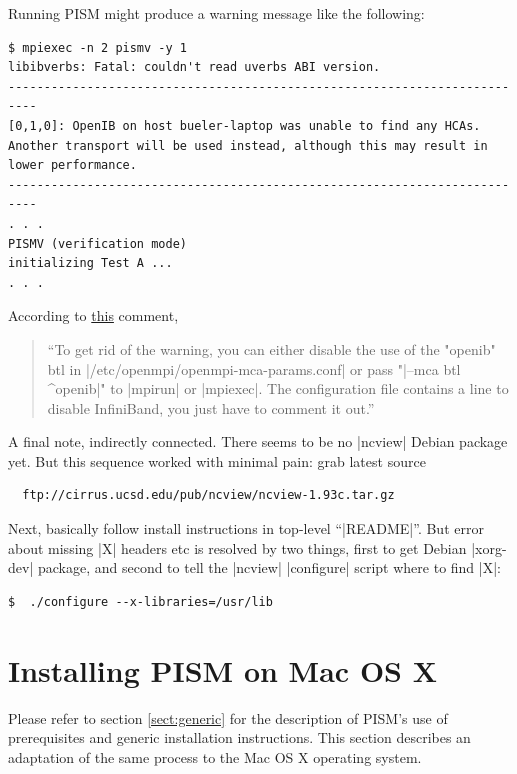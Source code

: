 \documentclass[11pt,final]{amsart}
\begin{document}
Running PISM might produce a warning message like the following:
\begin{verbatim}
$ mpiexec -n 2 pismv -y 1
libibverbs: Fatal: couldn't read uverbs ABI version.
--------------------------------------------------------------------------
[0,1,0]: OpenIB on host bueler-laptop was unable to find any HCAs.
Another transport will be used instead, although this may result in 
lower performance.
--------------------------------------------------------------------------
. . .
PISMV (verification mode)
initializing Test A ...
. . .
\end{verbatim}
According to \href{http://lists.alioth.debian.org/pipermail/pkg-openmpi-commits/2007-August/000044.html}{this} comment,
\begin{quote}
   ``To get rid of the warning, you can either disable the use of the "openib" btl
   in |/etc/openmpi/openmpi-mca-params.conf| or pass "|--mca btl ^openib|" to |mpirun|
   or |mpiexec|. The configuration file contains a line to disable InfiniBand, you
   just have to comment it out.''
\end{quote}
\bigskip

A final note, indirectly connected. There seems to be no |ncview| Debian package
yet.  But this sequence worked with minimal pain: grab latest source
\begin{verbatim}
  ftp://cirrus.ucsd.edu/pub/ncview/ncview-1.93c.tar.gz
\end{verbatim}
Next, basically follow install instructions in top-level ``|README|''. But error about missing |X| headers etc is resolved by two
things, first to get Debian |xorg-dev| package, and second to tell the |ncview| |configure| script where to find |X|:
\begin{verbatim}
$  ./configure --x-libraries=/usr/lib
\end{verbatim}

\clearpage
\section{Installing PISM on Mac OS X}
\label{sec:macosx}

Please refer to section \ref{sect:generic} for the description of PISM's use of prerequisites and generic installation
instructions. This section describes an adaptation of the same process to the Mac OS X operating system.
\end{document}
